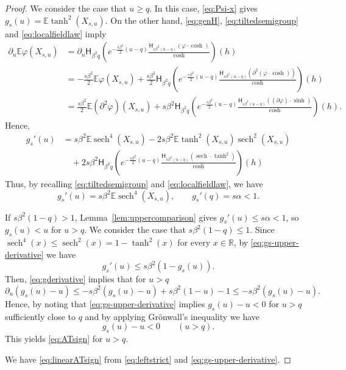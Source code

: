\documentclass[11pt]{article}
\numberwithin{equation}{section}
\newcommand{\E}{\mathbb{E}}
\newcommand{\1}{\mathbf 1}
\newcommand{\sech}{\operatorname{sech}}
\begin{document}
\begin{proof}
We consider the case that $u\ge q$.
In this case, \eqref{eq:Psi-x} gives $g_s(u)=\E\tanh^2(X_{s,u})$.
On the other hand, \eqref{eq:genH}, \eqref{eq:tiltedsemigroup} and \eqref{eq:localfieldlaw} imply
\begin{align*}
\partial _u \E\varphi(X_{s,u}) &= \partial _u \mathsf H_{\beta ^2 q} \left( e^{-\frac{s\beta ^2}{2}(u-q)} \frac{\mathsf H_{s\beta ^2 (u-q)}(\varphi \cdot \cosh )}{\cosh} \right) (h) \\
%
&= -\frac{s\beta ^2}{2}\E\varphi(X_{s,u}) + \frac{s\beta ^2}{2} \mathsf H_{\beta ^2 q} \left( e^{-\frac{s\beta ^2}{2}(u-q)} \frac{\mathsf H_{s\beta ^2 (u-q)}( \partial ^2 (\varphi \cdot \cosh) )}{\cosh} \right) (h) \\
%
&= \frac{s\beta ^2}{2} \E (\partial ^2 \varphi )(X_{s,u}) + s\beta ^2 \mathsf H_{\beta ^2 q} \left( e^{-\frac{s\beta ^2}{2}(u-q)} \frac{\mathsf H_{s\beta ^2 (u-q)}( ( \partial \varphi ) \cdot \sinh )}{\cosh} \right) (h).
\end{align*}
Hence,
\begin{align*}
g_s'(u) &= s\beta ^2 \E \sech ^4 (X_{s,u}) -2 s\beta ^2 \E \tanh ^2(X_{s,u}) \sech ^2 (X_{s,u})\\
&\quad + 2 s\beta ^2 \mathsf H_{\beta ^2 q} \left( e^{-\frac{s\beta ^2}{2}(u-q)} \frac{\mathsf H_{s\beta ^2 (u-q)}( \sech \cdot \tanh ^2 )}{\cosh} \right) (h)
\end{align*}
Thus, by recalling \eqref{eq:tiltedsemigroup} and \eqref{eq:localfieldlaw}, we have
\begin{equation}
 g_s'(u)=s\beta^2\E\sech^4(X_{s,u}),
 \qquad g_s'(q)=s\alpha<1.
 \label{eq:gs-upper-derivative}
\end{equation}

If $s\beta^2(1-q)>1$, Lemma~\ref{lem:uppercomparison} gives
$g_s'(u)\le s\alpha <1$, so $g_s(u)<u$ for $u>q$.
We consider the case that $s\beta^2(1-q)\le1$.
Since
$\sech^4(x)\le\sech^2(x)=1-\tanh^2(x)$ for every $x\in\mathbb R$,
by \eqref{eq:gs-upper-derivative} we have
\begin{equation}\label{eq:gderivative}
 g_s'(u)\le s\beta^2(1-g_s(u)).
\end{equation}
Then, \eqref{eq:gderivative} implies that for $u>q$
\[
\partial _u (g_s(u) -u) \leq -s\beta ^2 (g_s(u)-u) + s\beta ^2 (1-u) -1 \leq -s\beta ^2 (g_s(u)-u) .
\]
Hence, by noting that \eqref{eq:gs-upper-derivative} implies $g_s(u)-u <0$ for $u>q$ sufficiently close to $q$ and by applying Gr\"onwall's inequality we have
\[
g_s(u) - u < 0 \qquad (u>q) .
\]
This yields \eqref{eq:ATsign} for $u>q$.

We have \eqref{eq:linearATsign} from \eqref{eq:leftstrict} and \eqref{eq:gs-upper-derivative}.
\end{proof}
\end{document}
